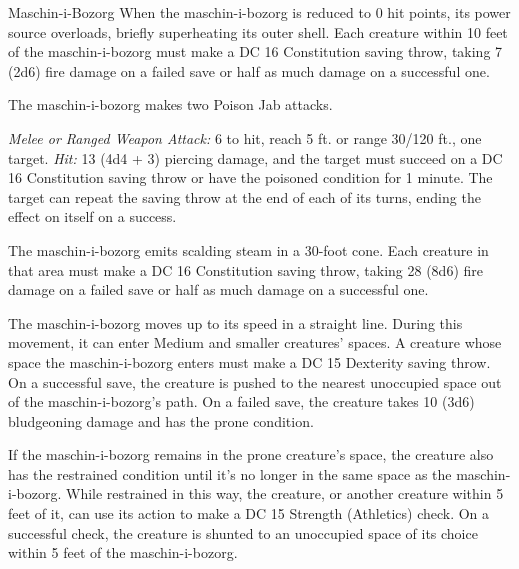 \documentclass[10pt,a4paper,twoside,bg=print,twocolumn,openany,nodeprecatedcode]{dndbook}
\begin{document}
\begin{DndMonster}[float=t]{Maschin-i-Bozorg}
\DndMonsterBasics[
armor-class = {17 (natural armor)},
hit-points = {\DndDice{9d10 + 45}},
speed = {20 ft.}
]
\DndMonsterAbilityScores[
 str = 18,
 dex = 16,
 con = 20,
 int = 2,
 wis = 10,
 cha = 1
]
\DndMonsterDetails[
damage-immunities = {poison, psychic},
condition-immunities = {charmed, deafened, exhaustion, frightened, paralyzed, poisoned, unconscious},
senses = {darkvision 120 ft., passive perception 10},
languages = {understands Gnomish but can't speak},
challenge = 8,
]
When the maschin-i-bozorg is reduced to 0 hit points, its power source overloads, briefly superheating its outer shell. Each creature within 10 feet of the maschin-i-bozorg must make a DC 16 Constitution saving throw, taking 7 (2d6) fire damage on a failed save or half as much damage on a successful one.

The maschin-i-bozorg makes two Poison Jab attacks.

\textsl{Melee or Ranged Weapon Attack:} 6 to hit, reach 5 ft. or range 30/120 ft., one target. \textsl{Hit:} 13 (4d4 + 3) piercing damage, and the target must succeed on a DC 16 Constitution saving throw or have the poisoned condition for 1 minute. The target can repeat the saving throw at the end of each of its turns, ending the effect on itself on a success.

The maschin-i-bozorg emits scalding steam in a 30-foot cone. Each creature in that area must make a DC 16 Constitution saving throw, taking 28 (8d6) fire damage on a failed save or half as much damage on a successful one.

The maschin-i-bozorg moves up to its speed in a straight line. During this movement, it can enter Medium and smaller creatures' spaces. A creature whose space the maschin-i-bozorg enters must make a DC 15 Dexterity saving throw. On a successful save, the creature is pushed to the nearest unoccupied space out of the maschin-i-bozorg's path. On a failed save, the creature takes 10 (3d6) bludgeoning damage and has the prone condition.

If the maschin-i-bozorg remains in the prone creature's space, the creature also has the restrained condition until it's no longer in the same space as the maschin-i-bozorg. While restrained in this way, the creature, or another creature within 5 feet of it, can use its action to make a DC 15 Strength (Athletics) check. On a successful check, the creature is shunted to an unoccupied space of its choice within 5 feet of the maschin-i-bozorg.

\end{DndMonster}
\end{document}
